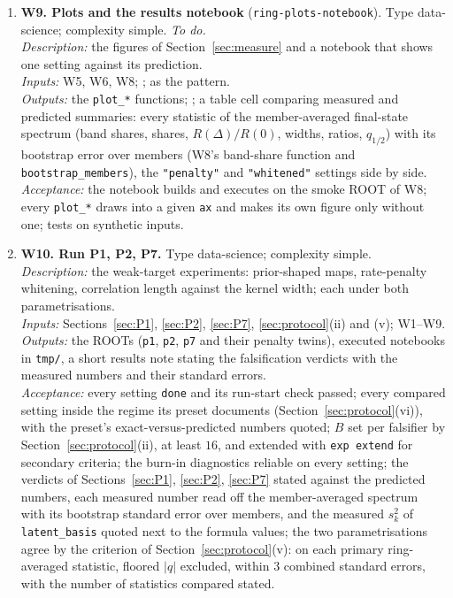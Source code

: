 \documentclass[11pt,a4paper]{article}
\newcommand{\code}[1]{\texttt{#1}}
\begin{document}
\begin{enumerate}[leftmargin=2em,itemsep=5pt]
  \item \textbf{W9. Plots and the results notebook} (\code{ring-plots-notebook}). Type data-science; complexity simple. \emph{To do.}\\
  \emph{Description:} the figures of Section~\ref{sec:measure} and a notebook that shows one setting against its prediction.\\
  \emph{Inputs:} W5, W6, W8; ;  as the pattern.\\
  \emph{Outputs:} the \code{plot\_*} functions; ; a table cell comparing measured and predicted summaries: every statistic of the member-averaged final-state spectrum (band shares, shares, $R(\Delta)/R(0)$, widths, ratios, $q_{1/2}$) with its bootstrap error over members (W8's band-share function and \code{bootstrap\_members}), the \code{"penalty"} and \code{"whitened"} settings side by side.\\
  \emph{Acceptance:} the notebook builds and executes on the smoke ROOT of W8; every \code{plot\_*} draws into a given \code{ax} and makes its own figure only without one; tests on synthetic inputs.
  \item \textbf{W10. Run P1, P2, P7.} Type data-science; complexity simple.\\
  \emph{Description:} the weak-target experiments: prior-shaped maps, rate-penalty whitening, correlation length against the kernel width; each under both parametrisations.\\
  \emph{Inputs:} Sections~\ref{sec:P1}, \ref{sec:P2}, \ref{sec:P7}, \ref{sec:protocol}(ii) and (v); W1--W9.\\
  \emph{Outputs:} the ROOTs (\code{p1}, \code{p2}, \code{p7} and their penalty twins), executed notebooks in \code{tmp/}, a short results note stating the falsification verdicts with the measured numbers and their standard errors.\\
  \emph{Acceptance:} every setting \code{done} and its run-start check passed; every compared setting inside the regime its preset documents (Section~\ref{sec:protocol}(vi)), with the preset's exact-versus-predicted numbers quoted; $B$ set per falsifier by Section~\ref{sec:protocol}(ii), at least $16$, and extended with \code{exp extend} for secondary criteria; the burn-in diagnostics reliable on every setting; the verdicts of Sections~\ref{sec:P1}, \ref{sec:P2}, \ref{sec:P7} stated against the predicted numbers, each measured number read off the member-averaged spectrum with its bootstrap standard error over members, and the measured $s_k^2$ of \code{latent\_basis} quoted next to the formula values; the two parametrisations agree by the criterion of Section~\ref{sec:protocol}(v): on each primary ring-averaged statistic, floored $|q|$ excluded, within $3$ combined standard errors, with the number of statistics compared stated.

\end{enumerate}
\end{document}
